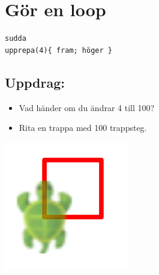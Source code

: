 \chapter{Gör en loop}
\begin{multicols}{2}

\begin{lstlisting}[basicstyle={\ttfamily\fontsize{36}{43}\selectfont},numbers=none]
sudda
upprepa(4){ fram; höger }
\end{lstlisting}
        
\section*{\color{BrickRed}Uppdrag:}


\begin{itemize}

\item {Vad händer om du ändrar 4 till 100?}
\item {Rita en trappa med 100 trappsteg.}

\end{itemize}



\columnbreak

\begin{center}
\includegraphics{../img/square.png}
\end{center}

\end{multicols}

